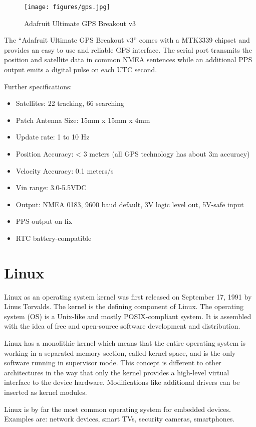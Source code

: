 \begin{figure}[tb]
	\centering
	\texttt{[image: figures/gps.jpg]}
	\caption{Adafruit Ultimate GPS Breakout v3}
	\label{fig:gps}
\end{figure}

The “Adafruit Ultimate GPS Breakout v3” comes with a MTK3339 chipset and provides an easy to use and reliable GPS interface. The serial port transmits the position and satellite data in common NMEA sentences while an additional PPS output emits a digital pulse on each UTC second.

Further specifications:
\begin{itemize}
\item Satellites: 22 tracking, 66 searching
\item Patch Antenna Size: 15mm x 15mm x 4mm
\item Update rate: 1 to 10 Hz
\item Position Accuracy: < 3 meters (all GPS technology has about 3m accuracy)
\item Velocity Accuracy: 0.1 meters/s
\item Vin range: 3.0-5.5VDC
\item Output: NMEA 0183, 9600 baud default, 3V logic level out, 5V-safe input
\item PPS output on fix
\item RTC battery-compatible
\end{itemize}

\section{Linux}

Linux as an operating system kernel was first released on September 17, 1991 by Linus Torvalds. The kernel is the defining component of Linux. The operating system (OS) is a Unix-like and mostly POSIX-compliant system. It is assembled with the idea of free and open-source software development and distribution.

Linux has a monolithic kernel which means that the entire operating system is working in a separated memory section, called kernel space, and is the only software running in supervisor mode. This concept is different to other architectures in the way that only the kernel provides a high-level virtual interface to the device hardware. Modifications like additional drivers can be inserted as kernel modules.

Linux is by far the most common operating system for embedded devices. Examples are: network devices, smart TVs, security cameras, smartphones.

